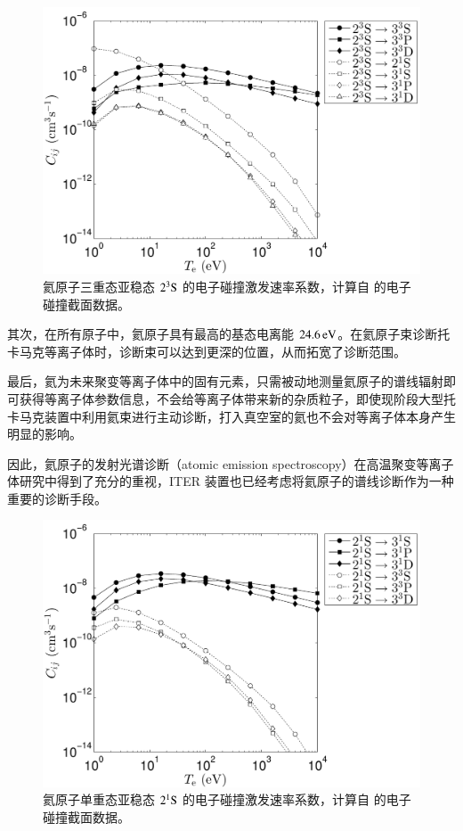 \begin{figure}
  \centering
  \includegraphics[height=0.35\textheight]{excRate-from-2.pdf}
  \caption{氦原子三重态亚稳态 $2^3{\rm S}$ 的电子碰撞激发速率系数，计算自  的电子碰撞截面数据。}
  \label{fig:chap01:excRate:metatriplet}
\end{figure}

其次，在所有原子中，氦原子具有最高的基态电离能 $24.6\,{\rm eV}$。在氦原子束诊断托卡马克等离子体时，诊断束可以达到更深的位置，从而拓宽了诊断范围。

最后，氦为未来聚变等离子体中的固有元素，只需被动地测量氦原子的谱线辐射即可获得等离子体参数信息，不会给等离子体带来新的杂质粒子，即使现阶段大型托卡马克装置中利用氦束进行主动诊断，打入真空室的氦也不会对等离子体本身产生明显的影响\cite{Schmitz2008}。

因此，氦原子的发射光谱诊断（atomic emission spectroscopy）在高温聚变等离子体研究中得到了充分的重视，ITER 装置也已经考虑将氦原子的谱线诊断作为一种重要的诊断手段\cite{Mullane2002}。

\begin{figure}
  \centering
  \includegraphics[height=0.35\textheight]{excRate-from-3.pdf}
  \caption{氦原子单重态亚稳态 $2^1{\rm S}$ 的电子碰撞激发速率系数，计算自  的电子碰撞截面数据。}
  \label{fig:chap01:excRate:metasinglet}
\end{figure}


